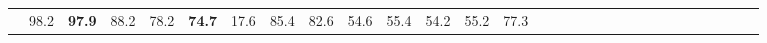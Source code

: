 \begin{table*}[]
\begin{tabular}{cc|cccccccccccccccccccccccccccc}
\hspace{-0.4em} & \hspace{-0.9em}98.2\hspace{-0.4em} & \hspace{-0.9em}\textbf{97.9}\hspace{-0.4em} & \hspace{-0.9em}88.2\hspace{-0.4em} & \hspace{-0.9em}78.2\hspace{-0.4em} & \hspace{-0.9em}\textbf{74.7}\hspace{-0.4em} & \hspace{-0.9em}17.6\hspace{-0.4em} & \hspace{-0.9em}85.4\hspace{-0.4em} & \hspace{-0.9em}82.6\hspace{-0.4em} & \hspace{-0.9em}54.6\hspace{-0.4em} & \hspace{-0.9em}55.4\hspace{-0.4em} & \hspace{-0.9em}54.2\hspace{-0.4em} & \hspace{-0.9em}55.2\hspace{-0.4em} & \hspace{-0.9em}77.3\hspace{-0.4em} 
        \\

\end{tabular}
\end{table*}
